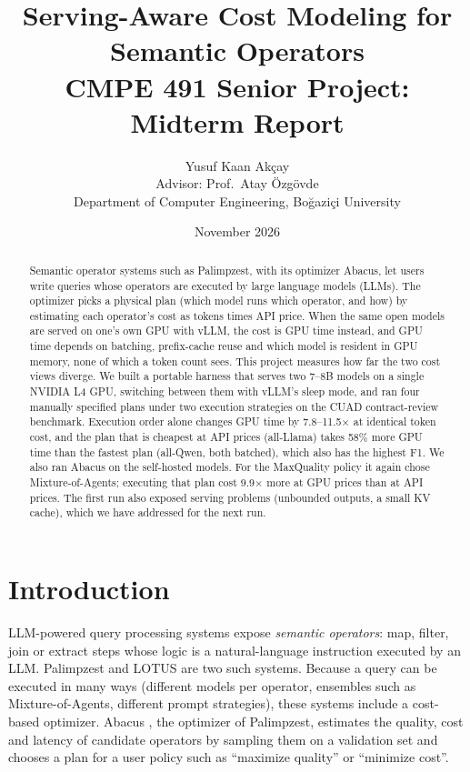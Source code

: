 \documentclass[11pt,a4paper]{article}
\title{\textbf{Serving-Aware Cost Modeling for Semantic Operators}\\[0.3em]
\large CMPE 491 Senior Project: Midterm Report}
\author{Yusuf Kaan Akçay\\
\small Advisor: Prof.\ Atay Özgövde\\
\small Department of Computer Engineering, Boğaziçi University}
\date{November 2026}
\begin{document}
\maketitle

\begin{abstract}
Semantic operator systems such as Palimpzest, with its optimizer Abacus, let users write queries
whose operators are executed by large language models (LLMs). The optimizer picks a physical plan
(which model runs which operator, and how) by estimating each operator's cost as tokens times API
price. When the same open models are served on one's own GPU with vLLM, the cost is GPU time
instead, and GPU time depends on batching, prefix-cache reuse and which model is resident in GPU
memory, none of which a token count sees. This project measures how far the two cost views
diverge. We built a portable harness that serves two 7--8B models on a single NVIDIA L4 GPU, switching
between them with vLLM's sleep mode, and ran four manually specified plans under two execution strategies on
the CUAD contract-review benchmark. Execution order alone changes GPU time by 7.8--11.5$\times$ at
identical token cost, and the plan that is cheapest at API prices (all-Llama) takes 58\% more GPU time
than the fastest plan (all-Qwen, both batched), which also has the highest F1. We also ran Abacus on the self-hosted models.
For the MaxQuality policy it again chose Mixture-of-Agents; executing that plan cost 9.9$\times$ more
at GPU prices than at API prices. The first run also exposed serving problems (unbounded outputs, a
small KV cache), which we have addressed for the next run.
\end{abstract}

\section{Introduction}

LLM-powered query processing systems expose \emph{semantic operators}: map, filter, join or
extract steps whose logic is a natural-language instruction executed by an LLM. Palimpzest
\cite{palimpzest} and LOTUS \cite{lotus} are two such systems. Because a query can be executed in
many ways (different models per operator, ensembles such as Mixture-of-Agents, different prompt
strategies), these systems include a cost-based optimizer. Abacus \cite{russo2025abacus}, the
optimizer of Palimpzest, estimates the quality, cost and latency of candidate operators by sampling
them on a validation set and chooses a plan for a user policy such as ``maximize quality'' or
``minimize cost''.
\end{document}
